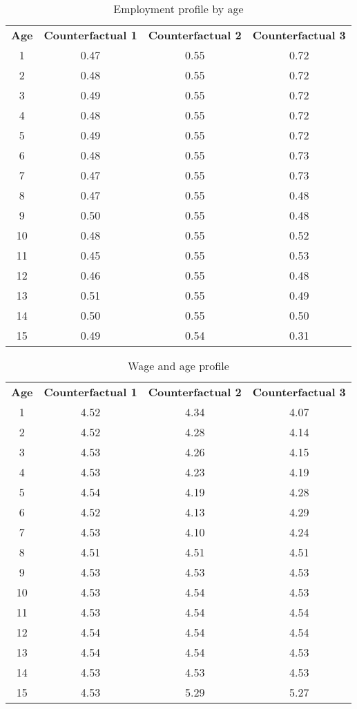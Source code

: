 \documentclass[11pt]{article}
\begin{document}
\begin{table}[H]
  \centering
  \caption{Employment profile by age}
    \begin{tabular}{cccc}
    \textbf{Age} & \textbf{Counterfactual 1} & \textbf{Counterfactual 2} & \textbf{Counterfactual 3} \\
    1     & 0.47  & 0.55  & 0.72 \\
    2     & 0.48  & 0.55  & 0.72 \\
    3     & 0.49  & 0.55  & 0.72 \\
    4     & 0.48  & 0.55  & 0.72 \\
    5     & 0.49  & 0.55  & 0.72 \\
    6     & 0.48  & 0.55  & 0.73 \\
    7     & 0.47  & 0.55  & 0.73 \\
    8     & 0.47  & 0.55  & 0.48 \\
    9     & 0.50  & 0.55  & 0.48 \\
    10    & 0.48  & 0.55  & 0.52 \\
    11    & 0.45  & 0.55  & 0.53 \\
    12    & 0.46  & 0.55  & 0.48 \\
    13    & 0.51  & 0.55  & 0.49 \\
    14    & 0.50  & 0.55  & 0.50 \\
    15    & 0.49  & 0.54  & 0.31 \\
    \end{tabular}%
  \label{tab:addlabel}%
\end{table}%


\begin{table}[htbp]
  \centering
  \caption{Wage and age profile}
    \begin{tabular}{cccc}
    \textbf{Age} & \textbf{Counterfactual 1} & \textbf{Counterfactual 2} & \textbf{Counterfactual 3} \\
    1     & 4.52  & 4.34  & 4.07 \\
    2     & 4.52  & 4.28  & 4.14 \\
    3     & 4.53  & 4.26  & 4.15 \\
    4     & 4.53  & 4.23  & 4.19 \\
    5     & 4.54  & 4.19  & 4.28 \\
    6     & 4.52  & 4.13  & 4.29 \\
    7     & 4.53  & 4.10  & 4.24 \\
    8     & 4.51  & 4.51  & 4.51 \\
    9     & 4.53  & 4.53  & 4.53 \\
    10    & 4.53  & 4.54  & 4.53 \\
    11    & 4.53  & 4.54  & 4.54 \\
    12    & 4.54  & 4.54  & 4.54 \\
    13    & 4.54  & 4.54  & 4.53 \\
    14    & 4.53  & 4.53  & 4.53 \\
    15    & 4.53  & 5.29  & 5.27 \\
    \end{tabular}%
  \label{tab:addlabel}%
\end{table}%
\end{document}
